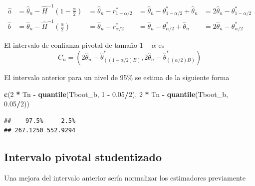 \documentclass[
  12pt,
]{book}
\newenvironment{Shaded}{\begin{snugshade}}{\end{snugshade}}
\newcommand{\DecValTok}[1]{\textcolor[rgb]{0.00,0.00,0.81}{#1}}
\newcommand{\FloatTok}[1]{\textcolor[rgb]{0.00,0.00,0.81}{#1}}
\newcommand{\KeywordTok}[1]{\textcolor[rgb]{0.13,0.29,0.53}{\textbf{#1}}}
\newcommand{\NormalTok}[1]{#1}
\newcommand{\OperatorTok}[1]{\textcolor[rgb]{0.81,0.36,0.00}{\textbf{#1}}}
\newcommand{\StringTok}[1]{\textcolor[rgb]{0.31,0.60,0.02}{#1}}
\theoremstyle{definition}
\theoremstyle{definition}
\theoremstyle{definition}
\theoremstyle{remark}
\let\BeginKnitrBlock\begin \let\EndKnitrBlock\end
\begin{document}
\begin{align*}
\widehat{a}
&= \widehat{\theta}_{n}-\widehat{H}^{-1}\left(1-\frac{\alpha}{2}\right)
&= \widehat{\theta}_{n}-r_{1-\alpha / 2}^{*}
&= \widehat{\theta}_{n}-\theta_{1-\alpha / 2}^{*} + \widehat{\theta}_{n}
&=2 \widehat{\theta}_{n}-\theta_{1-\alpha / 2}^{*} \\
\widehat{b} &=\widehat{\theta}_{n}-\widehat{H}^{-1}\left(\frac{\alpha}{2}\right)
&=\widehat{\theta}_{n}-r_{\alpha / 2}^{*}
&= \widehat{\theta}_{n}-\theta_{\alpha / 2}^{*} + \widehat{\theta}_{n}
&=2 \widehat{\theta}_{n}-\theta_{\alpha / 2}^{*}
\end{align*}

\BeginKnitrBlock{remark}
{}El intervalo de confianza pivotal de tamaño \(1-\alpha\) es
\[
  C_{n}=\left(2 \widehat{\theta}_{n}-\widehat{\theta}_{((1-\alpha / 2) B)}^{*}, 2 \widehat{\theta}_{n}-\widehat{\theta}_{((\alpha / 2) B)}^{*}\right)
  \]
\EndKnitrBlock{remark}

\BeginKnitrBlock{exercise}
\protect\hypertarget{exr:unnamed-chunk-99}{}{\label{exr:unnamed-chunk-99} }El intervalo anterior para un nivel de 95\% se estima de la siguiente forma
\EndKnitrBlock{exercise}

\begin{Shaded}
\begin{Highlighting}[]
\KeywordTok{c}\NormalTok{(}\DecValTok{2} \OperatorTok{*}\StringTok{ }\NormalTok{Tn }\OperatorTok{-}\StringTok{ }\KeywordTok{quantile}\NormalTok{(Tboot_b, }\DecValTok{1} \OperatorTok{-}\StringTok{ }\FloatTok{0.05}\OperatorTok{/}\DecValTok{2}\NormalTok{), }\DecValTok{2} \OperatorTok{*}\StringTok{ }\NormalTok{Tn }\OperatorTok{-}\StringTok{ }
\StringTok{    }\KeywordTok{quantile}\NormalTok{(Tboot_b, }\FloatTok{0.05}\OperatorTok{/}\DecValTok{2}\NormalTok{))}
\end{Highlighting}
\end{Shaded}

\begin{verbatim}
##    97.5%     2.5% 
## 267.1250 552.9294
\end{verbatim}

\texttt{}

\hypertarget{intervalo-pivotal-studentizado}{%
\subsection{Intervalo pivotal studentizado}\label{intervalo-pivotal-studentizado}}

Una mejora del intervalo anterior sería normalizar los estimadores previamente
\end{document}

